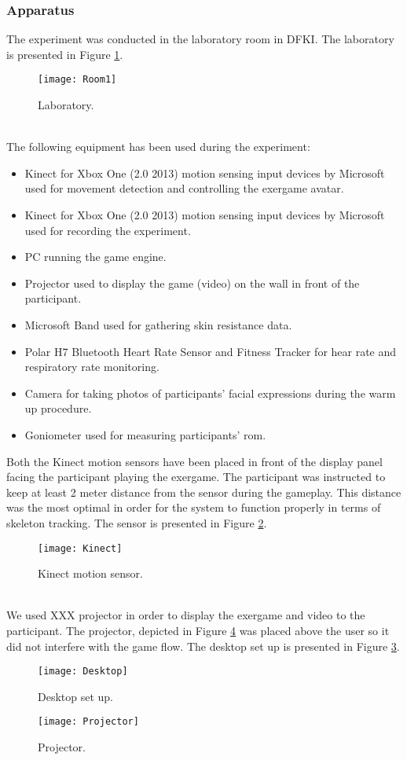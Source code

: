 \subsubsection{Apparatus}
The experiment was conducted in the laboratory room in DFKI. The laboratory is presented in Figure \ref{fig:lab1}.\\ 
\begin{figure}[h]
    \centering
    \texttt{[image: Room1]}
    \caption{Laboratory.}
    \label{fig:lab1}
\end{figure}\\
The following equipment has been used during the experiment:
\begin{itemize}
\item Kinect for Xbox One (2.0 2013) motion sensing input devices by Microsoft used for movement detection and controlling the exergame avatar. 
\item Kinect for Xbox One (2.0 2013) motion sensing input devices by Microsoft used for recording the experiment. 
\item PC running the game engine.
\item Projector used to display the game (video) on the wall in front of the participant.
\item Microsoft Band used for gathering skin resistance data.
\item Polar H7 Bluetooth Heart Rate Sensor and Fitness Tracker for hear rate and respiratory rate monitoring.
\item Camera for taking photos of participants' facial expressions during the warm up procedure.
\item Goniometer used for measuring participants' \acrshort{rom}.
\end{itemize}\pagebreak
Both the Kinect motion sensors have been placed in front of the display panel facing the participant playing the exergame. The participant was instructed to keep at least 2 meter distance from the sensor during the gameplay. This distance was the most optimal in order for the system to function properly in terms of skeleton tracking. The sensor is presented in Figure \ref{fig:kinect}.\\
\begin{figure}[h]
    \centering
    \texttt{[image: Kinect]}
    \caption{Kinect motion sensor.}
    \label{fig:kinect}
\end{figure}\\
We used XXX projector in order to display the exergame and video to the participant. The projector, depicted in Figure \ref{fig:projector} was placed above the user so it did not interfere with the game flow. The desktop set up is presented in Figure \ref{fig:desktop}.\\
\begin{figure}[h]
    \centering
    \texttt{[image: Desktop]}
    \caption{Desktop set up.}
    \label{fig:desktop}
\end{figure}
\begin{figure}[h]
    \centering
    \texttt{[image: Projector]}
    \caption{Projector.}
    \label{fig:projector}
\end{figure}
